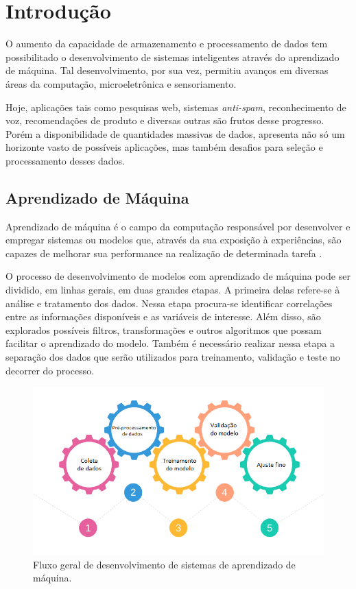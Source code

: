 \chapter[Introdução]{Introdução}

O aumento da capacidade de armazenamento e processamento de dados tem possibilitado o desenvolvimento de sistemas inteligentes através do aprendizado de máquina. Tal desenvolvimento, por sua vez, permitiu avanços em diversas áreas da computação, microeletrônica e sensoriamento. 

Hoje, aplicações tais como pesquisas web, sistemas \textit{anti-spam}, reconhecimento de voz, recomendações de produto e diversas outras são frutos desse progresso. Porém a disponibilidade de quantidades massivas de dados, apresenta não só um horizonte vasto de possíveis aplicações, mas também desafios para seleção e processamento desses dados.


\section{Aprendizado de Máquina}

Aprendizado de máquina é o campo da computação responsável por desenvolver e empregar sistemas ou modelos que, através da sua exposição à experiências, são capazes de melhorar sua performance na realização de determinada tarefa \cite{mitchell_1997}.

O processo de desenvolvimento de modelos com aprendizado de máquina pode ser dividido, em linhas gerais, em duas grandes etapas. A primeira delas refere-se à análise e tratamento dos dados. Nessa etapa procura-se identificar correlações entre as informações disponíveis e as variáveis de interesse. Além disso, são explorados possíveis filtros, transformações e outros algoritmos que possam facilitar o aprendizado do modelo. Também é necessário realizar nessa etapa a separação dos dados que serão utilizados para treinamento, validação e teste no decorrer do processo.

\begin{figure}[!htb]
    \caption{Fluxo geral de desenvolvimento de sistemas de aprendizado de máquina.}
    \begin{center}
    \includegraphics[width=\linewidth]{imgs/intro/MLFlow}
    \end{center}
    \label{fig:mlflow}
\end{figure}

